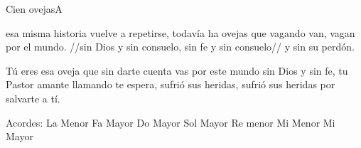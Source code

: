 \documentclass[12pt, spanish]{book}
\begin{document}
\begin{song}{Cien ovejas}{A}
        \begin{SBOpGroup}
            esa misma historia vuelve
            a repetirse, todavía ha ovejas
            que vagando van, vagan por el
            mundo.
            //sin Dios y sin consuelo,
            sin fe y sin consuelo//
            y sin su perdón.
        \end{SBOpGroup}

        \begin{SBOpGroup}
            Tú eres esa oveja que sin darte cuenta
            vas por este mundo sin Dios y sin fe,
            tu Pastor amante llamando te espera,
            sufrió sus heridas, sufrió sus heridas
            por salvarte a tí.
        \end{SBOpGroup}

        \ifChordBk
        \begin{SBOpGroup}
            Acordes:\break
            \upchord{\Am}\qquad La Menor \hfill
            \upchord{\F}\qquad Fa Mayor \hfill\null\break
            \upchord{\C}\qquad Do Mayor  \hfill
            \upchord{\G}\qquad Sol Mayor \hfill
            \upchord{\Dm}\qquad Re menor  \hfill\null\break
            \upchord{\Em}\qquad Mi Menor \hfill
            \upchord{\E}\qquad Mi Mayor \hfill\null\break
        \end{SBOpGroup}
        \fi
    \end{song}
\end{document}
